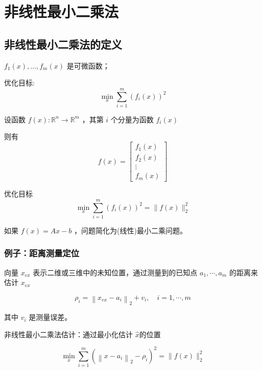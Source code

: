 \chapter{非线性最小二乘法}

\section{非线性最小二乘法的定义}

\begin{problem}
    $ f_{1}(x), \ldots, f_{m}(x) $ 是可微函数；

    优化目标: $$ \min _{x} \sum_{i=1}^{m}\left(f_{i}(x)\right)^{2} $$

\end{problem}

\begin{problem}
    \label{pbl:non-linear-least-squares}
    设函数 $ f(x): \mathbb{R}^{n} \rightarrow \mathbb{R}^{m} $ ，其第 $ i $ 个分量为函数 $ f_{i}(x)$

    则有
    $$
    f(x)=\left[\begin{array}{c}
    f_{1}(x) \\
    f_{2}(x) \\
    \vdots \\
    f_{m}(x)
    \end{array}\right]
    $$

    优化目标
    $$ \min _{x} \sum_{i=1}^{m}\left(f_{i}(x)\right)^{2}=\|f(x)\|_{2}^{2} $$
\end{problem}


如果 $ f(x)=A x-b $ ，问题简化为(线性)最小二乘问题。

\subsection{例子：距离测量定位}

\begin{problem}
    向量 $ x_{e x} $ 表示二维或三维中的未知位置，通过测量到的已知点 $ a_{1}, \cdots, a_{m} $ 的距离来估计 $ x_{e x} $ 

    $$
    \rho_{i}=\left\|x_{e x}-a_{i}\right\|_{2}+v_{i}, \quad i=1, \cdots, m
    $$

    其中 $ v_{i} $ 是测量误差。
\end{problem}

非线性最小二乘法估计：通过最小化估计 $ \hat{x} $的位置

$$
\min _{x} \sum_{i=1}^{m}\left(\left\|x-a_{i}\right\|_{2}-\rho_{i}\right)^{2}=\|f(x)\|_{2}^{2}
$$

